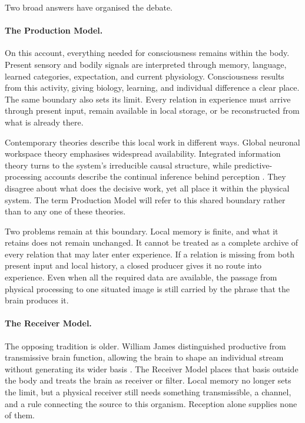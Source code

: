 Two broad answers have organised the debate.

\paragraph{The Production Model.}
On this account, everything needed for consciousness remains within the body. Present
sensory and bodily signals are interpreted through memory, language, learned
categories, expectation, and current physiology. Consciousness results from this
activity, giving biology, learning, and individual difference a clear place. The same
boundary also sets its limit. Every relation in experience must
arrive through present input, remain available in local storage, or be reconstructed
from what is already there.

Contemporary theories describe this local work in different ways. Global neuronal
workspace theory emphasises widespread availability. Integrated information theory
turns to the system's irreducible causal structure, while predictive-processing
accounts describe the continual inference behind perception
\citep{dehaene2011,tononi2004,raoballard1999,friston2010}. They disagree about what
does the decisive work, yet all place it within the physical system. The term
Production Model will refer to this shared boundary rather than to any one of these
theories.

Two problems remain at this boundary. Local memory is finite, and what it retains does
not remain unchanged. It cannot be treated as a complete archive of every relation
that may later enter experience. If a relation is missing from both present input and
local history, a closed producer gives it no route into experience. Even when all the
required data are available, the passage from physical processing to one situated
image is still carried by the phrase that the brain produces it.

\paragraph{The Receiver Model.}
The opposing tradition is older. William James distinguished productive from
transmissive brain function, allowing the brain to shape an individual stream without
generating its wider basis \citep{james1898}. The Receiver Model places that basis
outside the body and treats the brain as receiver or filter. Local memory no longer
sets the limit, but a physical receiver still needs something transmissible, a channel,
and a rule connecting the source to this organism. Reception alone supplies none of
them.

